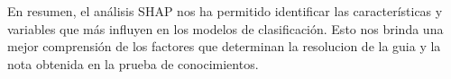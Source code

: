 


En resumen, el análisis SHAP nos ha permitido identificar las características y variables que más influyen en los modelos de clasificación. Esto nos brinda una mejor comprensión de los factores que determinan la resolucion de la guia y la nota obtenida en la prueba de conocimientos.



